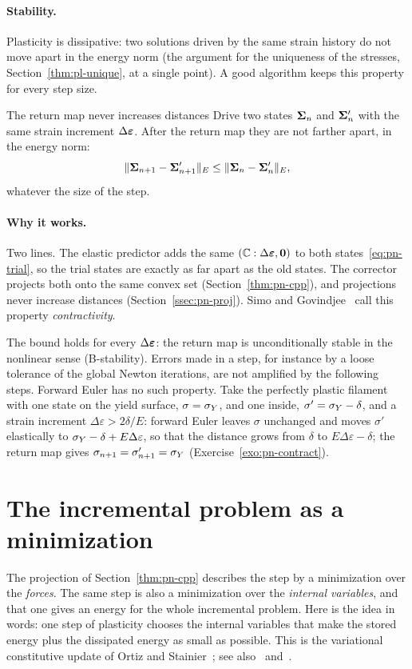 \paragraph{Stability.}
Plasticity is dissipative: two solutions driven by the same strain history do
not move apart in the energy norm (the argument for the uniqueness of the
stresses, Section~\ref{thm:pl-unique}, at a single point). A good algorithm
keeps this property for every step size.

\begin{gbox}{The return map never increases distances}\label{thm:pn-contract}
Drive two states $\bm{\Sigma}_n$ and $\bm{\Sigma}'_n$ with the same strain increment
$\Delta\bm{\varepsilon}$. After the return map they are not farther apart, in the energy
norm:
\[
  \lVert \bm{\Sigma}_{n+1}-\bm{\Sigma}'_{n+1}\rVert_E\le\lVert \bm{\Sigma}_n-\bm{\Sigma}'_n\rVert_E ,
\]
whatever the size of the step.
\end{gbox}
\paragraph{Why it works.} Two lines. The elastic predictor adds the same
$(\mathbb{C}:\Delta\bm{\varepsilon},\bm{0})$ to both states~\eqref{eq:pn-trial}, so the trial
states are exactly as far apart as the old states. The corrector projects
both onto the same convex set (Section~\ref{thm:pn-cpp}), and projections
never increase distances (Section~\ref{ssec:pn-proj}). Simo and
Govindjee~\cite{SimoGovindjee1991} call this property \emph{contractivity}.

The bound holds for every $\Delta\bm{\varepsilon}$: the return map is unconditionally
stable in the nonlinear sense (B-stability). Errors made in a step, for
instance by a loose tolerance of the global Newton iterations, are not
amplified by the following steps. Forward Euler has no such property. Take the
perfectly plastic filament with one state on the yield surface, $\sigma=\sigma_{Y}$,
and one inside, $\sigma'=\sigma_{Y}-\delta$, and a strain increment
$\Delta\varepsilon>2\delta/E$: forward Euler leaves $\sigma$ unchanged and
moves $\sigma'$ elastically to $\sigma_{Y}-\delta+E\Delta\varepsilon$, so that the
distance grows from $\delta$ to $E\Delta\varepsilon-\delta$; the return map
gives $\sigma_{n+1}=\sigma'_{n+1}=\sigma_{Y}$ (Exercise~\ref{exo:pn-contract}).

\section{The incremental problem as a minimization}\label{sec:pn-var}
%
The projection of Section~\ref{thm:pn-cpp} describes the step by a
minimization over the \emph{forces}. The same step is also a minimization over
the \emph{internal variables}, and that one gives an energy for the whole
incremental problem. Here is the idea in words: one step of plasticity
chooses the internal variables that make the stored energy plus the
dissipated energy as small as possible. This is the variational constitutive
update of Ortiz and Stainier~\cite{OrtizStainier1999}; see
also~\cite{Miehe2002} and~\cite[Sec.~2.8]{KondoMaitournam2023b}.


